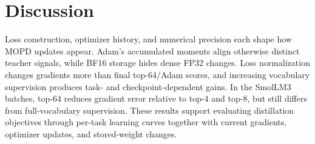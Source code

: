 \section{Discussion}

Loss construction, optimizer history, and numerical precision each shape how MOPD updates appear. Adam's accumulated moments align otherwise distinct teacher signals, while BF16 storage hides dense FP32 changes. Loss normalization changes gradients more than final top-64/Adam scores, and increasing vocabulary supervision produces task- and checkpoint-dependent gains. In the SmolLM3 batches, top-64 reduces gradient error relative to top-4 and top-8, but still differs from full-vocabulary supervision. These results support evaluating distillation objectives through per-task learning curves together with current gradients, optimizer updates, and stored-weight changes.
